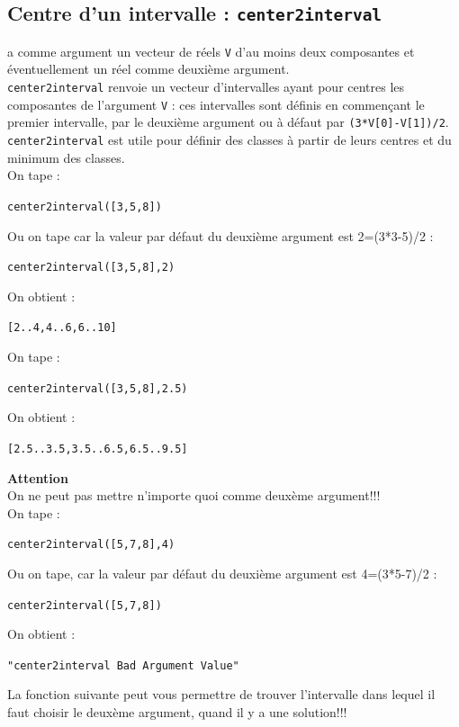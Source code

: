 \documentclass[a4paper,11pt]{book}
\begin{document}
\subsection{Centre d'un intervalle : {\tt center2interval}}
 a comme argument un vecteur de  r\'eels {\tt V}
 d'au moins deux composantes et \'eventuellement un r\'eel comme deuxi\`eme 
argument.\\
{\tt center2interval} renvoie un vecteur d'intervalles ayant pour centres 
les composantes de l'argument {\tt V} : ces intervalles sont d\'efinis en 
commen\c{c}ant le premier intervalle, par le deuxi\`eme argument ou \`a 
d\'efaut par {\tt (3*V[0]-V[1])/2}.\\
{\tt center2interval} est utile pour d\'efinir des classes \`a partir de leurs
 centres et du minimum des classes.\\
On tape :
\begin{center}{\tt center2interval([3,5,8])}\end{center}
Ou on tape  car la valeur par d\'efaut du deuxi\`eme argument est 2=(3*3-5)/2 :
\begin{center}{\tt center2interval([3,5,8],2)}\end{center}
On obtient :
\begin{center}{\tt [2..4,4..6,6..10]}\end{center}
On tape :
\begin{center}{\tt center2interval([3,5,8],2.5)}\end{center}
On obtient :
\begin{center}{\tt [2.5..3.5,3.5..6.5,6.5..9.5]}\end{center}
{\bf Attention} \\
On ne peut pas mettre n'importe quoi comme deux\`eme argument!!!\\
On tape :
\begin{center}{\tt center2interval([5,7,8],4)}\end{center}
Ou on tape, car la valeur par d\'efaut du deuxi\`eme argument est 4=(3*5-7)/2 :
\begin{center}{\tt center2interval([5,7,8])}\end{center}
On obtient :
\begin{center}{\tt "center2interval Bad Argument Value"}\end{center}
La fonction suivante peut vous permettre de trouver l'intervalle dans lequel 
il faut choisir le deux\`eme argument, quand il y a une solution!!!\\
\end{document}
